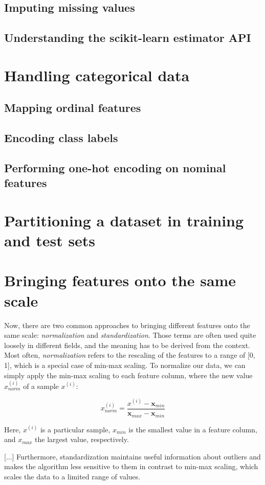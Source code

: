 \documentclass[letterpaper]{report}
\begin{document}
\subsection{Imputing missing values}
\subsection{Understanding the scikit-learn estimator API}
\section{Handling categorical data}
\subsection{Mapping ordinal features}
\subsection{Encoding class labels}
\subsection{Performing one-hot encoding on nominal features}
\section{Partitioning a dataset in training and test sets}
\section{Bringing features onto the same scale}

Now, there are two common approaches to bringing different features onto the same
scale: \textit{normalization} and \textit{standardization}. Those terms are often used quite loosely
in different fields, and the meaning has to be derived from the context. Most often,
\textit{normalization} refers to the rescaling of the features to a range of [0, 1], which is a
special case of min-max scaling.  To normalize our data, we can simply apply the
min-max scaling to each feature column, where the new value $x_{norm}^{(i)}$ of a sample  $x^{(i)}$:

\[
x_{norm}^{(i)} = \frac{x^{(i)} - \mathbf{x}_{min}}{\mathbf{x}_{max} - \mathbf{x}_{min}}
\]

Here, $x^{(i)}$ is a particular sample, $x_{min}$ is the smallest value in a feature column, and $x_{max}$ the largest value, respectively.

[...]  Furthermore, standardization maintains useful information about outliers and makes the algorithm less sensitive to them in contrast to min-max scaling, which scales
the data to a limited range of values.
\end{document}
